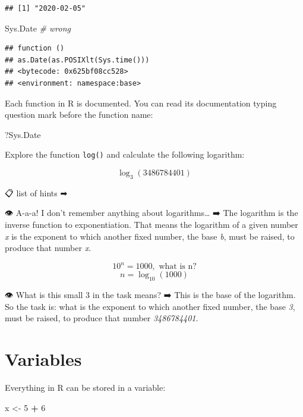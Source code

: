 \documentclass[
]{book}
\makeatletter
\newenvironment{Shaded}{\begin{snugshade}}{\end{snugshade}}
\newcommand{\CommentTok}[1]{\textcolor[rgb]{0.56,0.35,0.01}{\textit{#1}}}
\newcommand{\DecValTok}[1]{\textcolor[rgb]{0.00,0.00,0.81}{#1}}
\newcommand{\NormalTok}[1]{#1}
\newcommand{\OperatorTok}[1]{\textcolor[rgb]{0.81,0.36,0.00}{\textbf{#1}}}
\newcommand{\StringTok}[1]{\textcolor[rgb]{0.31,0.60,0.02}{#1}}
\newenvironment{kframe}{%
\medskip{}
\setlength{\fboxsep}{.8em}
 \def\at@end@of@kframe{}%
 \ifinner\ifhmode%
  \def\at@end@of@kframe{\end{minipage}}%
  \begin{minipage}{\columnwidth}%
 \fi\fi%
 \def\FrameCommand##1{\hskip\@totalleftmargin \hskip-\fboxsep
 \colorbox{shadecolor}{##1}\hskip-\fboxsep
     \hskip-\linewidth \hskip-\@totalleftmargin \hskip\columnwidth}%
 \MakeFramed {\advance\hsize-\width
   \@totalleftmargin\z@ \linewidth\hsize
   \@setminipage}}%
 {\par\unskip\endMakeFramed%
 \at@end@of@kframe}
\newenvironment{rmdblock}[1]
  {
  \begin{itemize}
  \renewcommand{\labelitemi}{
    \raisebox{-.7\height}[0pt][0pt]{
      {\setkeys{Gin}{width=3em,keepaspectratio}\texttt{[image: images/\#1]}}
    }
  }
  \setlength{\fboxsep}{1em}
  \begin{kframe}
  \item
  }
  {
  \end{kframe}
  \end{itemize}
  }
\newenvironment{rmdtask}
  {\begin{rmdblock}{task}}
  {\end{rmdblock}}
\makeatother
\begin{document}
\begin{verbatim}
## [1] "2020-02-05"
\end{verbatim}

\begin{Shaded}
\begin{Highlighting}[]
\NormalTok{Sys.Date }\CommentTok{# wrong}
\end{Highlighting}
\end{Shaded}

\begin{verbatim}
## function () 
## as.Date(as.POSIXlt(Sys.time()))
## <bytecode: 0x625bf08cc528>
## <environment: namespace:base>
\end{verbatim}

Each function in R is documented. You can read its documentation typing question mark before the function name:

\begin{Shaded}
\begin{Highlighting}[]
\NormalTok{?Sys.Date}
\end{Highlighting}
\end{Shaded}

\begin{rmdtask}
Explore the function \texttt{log()} and calculate the following
logarithm:
\end{rmdtask}

\[\log_3(3486784401)\]

📋 list of hints ➡

👁 A-a-a! I don't remember anything about logarithms\ldots{} ➡
The logarithm is the inverse function to exponentiation. That means the logarithm of a given number \emph{x} is the exponent to which another fixed number, the base \emph{b}, must be raised, to produce that number \emph{x}.

\[10^n = 1000,\text{ what is n?}\]
\[n = \log_{10}(1000)\]

👁 What is this small 3 in the task means? ➡
This is the base of the logarithm. So the task is: what is the exponent to which another fixed number, the base \emph{3}, must be raised, to produce that number \emph{3486784401}.

\hypertarget{variables}{%
\section{Variables}\label{variables}}

Everything in R can be stored in a variable:

\begin{Shaded}
\begin{Highlighting}[]
\NormalTok{x <-}\StringTok{ }\DecValTok{5} \OperatorTok{+}\StringTok{ }\DecValTok{6}
\end{Highlighting}
\end{Shaded}
\end{document}
